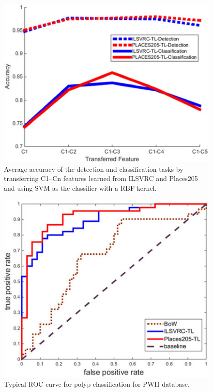 \documentclass[10pt,twocolumn,letterpaper]{article}
\begin{document}
\begin{figure}[t]
	\begin{center}
		\includegraphics[width=0.8\linewidth]{6}
	\end{center}
	\caption{Average accuracy of the detection and classification tasks by transferring C1–Cn features learned from ILSVRC and Places205 and using SVM as the classifier with a RBF kernel.} 
	\label{fig:long}
	\label{fig:onecol}
\end{figure}

\begin{figure}[t]
	\begin{center}
		\includegraphics[width=0.8\linewidth]{7}
	\end{center}
	\caption{Typical ROC curve for polyp classification for PWH database.} 
	\label{fig:long}
	\label{fig:onecol}
\end{figure}
\end{document}
